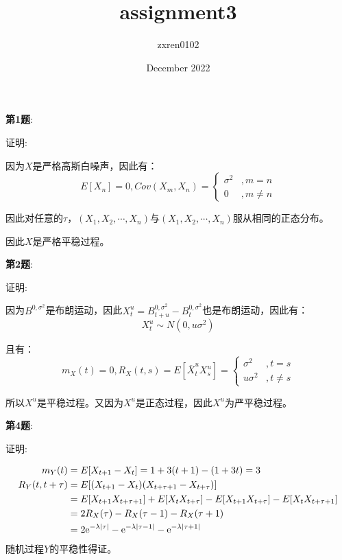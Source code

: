 \documentclass{article}
\title{assignment3}
\author{zxren0102 }
\date{December 2022}
\begin{document}
 

\maketitle

\noindent
\textbf{第1题}:

\noindent
证明:

因为$X$是严格高斯白噪声，因此有：
\begin{equation}
    E[X_{n}]=0,Cov(X_{m},X_{n})=\left\{
        \begin{aligned}
            \sigma^{2}&,m=n\\
            0         &,m\neq n
        \end{aligned}
    \right.
\end{equation}

因此对任意的$\tau$，$(X_{1},X_{2},\cdots,X_{n})$与$(X_{1},X_{2},\cdots,X_{n})$服从相同的正态分布。

因此$X$是严格平稳过程。

\noindent
\textbf{第2题}:

\noindent
证明:

因为$B^{0,\sigma^{2}}$是布朗运动，因此$X_{t}^{u}=B^{0,\sigma^{2}}_{t+u}-B^{0,\sigma^{2}}_{t}$也是布朗运动，因此有：
\begin{equation}
    X_{t}^{u}\sim N(0,u\sigma^2)
\end{equation}

且有：
\begin{equation}
    m_{X}(t)=0,R_{X}(t,s)=E[\overline{X}_{t}^{u}{X}_{s}^{u}]=\left\{
        \begin{aligned}
            \sigma^{2}&,t=s\\
            u\sigma^2 &,t\neq s
        \end{aligned}
    \right.
\end{equation}

所以$X^{u}$是平稳过程。又因为$X^{u}$是正态过程，因此$X^{u}$为严平稳过程。

\noindent
\textbf{第4题}:

\noindent
证明:

\begin{equation}
    \begin{aligned}
        m_{Y}(t)&=E[X_{t+1}-X_{t}]=1+3(t+1)-(1+3t)=3\\
        R_{Y}(t,t+\tau)&=E[(X_{t+1}-X_{t})(X_{t+\tau+1}-X_{t+\tau})]\\
        &=E[X_{t+1}X_{t+\tau+1}]+E[X_{t}X_{t+\tau}]-E[X_{t+1}X_{t+\tau}]-E[X_{t}X_{t+\tau+1}]\\
        &=2R_{X}(\tau)-R_{X}(\tau-1)-R_{X}(\tau+1)\\
        &=2{\rm e}^{-\lambda|\tau|}-{\rm e}^{-\lambda|\tau-1|}-{\rm e}^{-\lambda|\tau+1|}
    \end{aligned}
\end{equation}
随机过程$Y$的平稳性得证。
\end{document}
